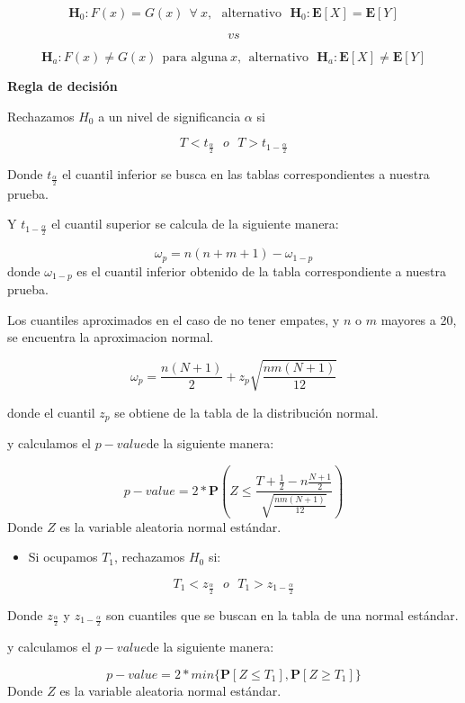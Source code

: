 \documentclass[
  a4paper,
  oneside,
  openany]{book}
\providecommand{\tightlist}{%
  \setlength{\itemsep}{0pt}\setlength{\parskip}{0pt}}
\begin{document}
\[\textbf{H}_0: F(x) = G(x) \ \  \forall\ x, \ \ \  \mbox{alternativo} \ \ \  \textbf{H}_0:\mathbf{E}[X] = \mathbf{E}[Y]\]

\[vs\]

\[\textbf{H}_a: F(x) \neq G(x) \ \ \mbox{para alguna} \ x,  \ \ \mbox{alternativo} \ \ \  \textbf{H}_a:
\mathbf{E}[X] \neq \mathbf{E}[Y]\]

\textbf{Regla de decisión}

Rechazamos \(H_0\) a un nivel de significancia \(\alpha\) si

\[T < t_{\frac{\alpha}{2}} \ \ \   o \ \ \ T > t_{1-\frac{\alpha}{2}}\]

Donde \(t_\frac{\alpha}{2}\) el cuantil inferior se busca en las tablas correspondientes a nuestra prueba.

Y \(t_{1-\frac{\alpha}{2}}\) el cuantil superior se calcula de la siguiente manera:

\[\omega_p= n(n+m+1)-\omega_{1-p}\]
donde \(\omega_{1-p}\) es el cuantil inferior obtenido de la tabla correspondiente a nuestra prueba.

Los cuantiles aproximados en el caso de no tener empates, y \(n\) o \(m\) mayores a 20, se encuentra la aproximacion normal.

\[\omega_p= \frac{n(N+1)}{2} + z_p\sqrt{\frac{n m(N+1)}{12}}\]

donde el cuantil \(z_p\) se obtiene de la tabla de la distribución normal.

y calculamos el \(p-value\)de la siguiente manera:

\[p-value = 2*\mathbf{P}\left(Z\leq\frac{T+\frac{1}{2}-n\frac{N+1}{2}}{\sqrt{\frac{nm(N+1)}{12}}}\right)\]
Donde \(Z\) es la variable aleatoria normal estándar.

\begin{itemize}
\tightlist
\item
  Si ocupamos \(T_{1}\), rechazamos \(H_0\) si:
\end{itemize}

\[T_{1} < z_{\frac{\alpha}{2}} \ \ \  o \ \ \  T_{1} > z_{1-\frac{\alpha}{2}}\]

Donde \(z_\frac{\alpha}{2}\) y \(z_{1-\frac{\alpha}{2}}\) son cuantiles que se buscan en la tabla de una normal estándar.

y calculamos el \(p-value\)de la siguiente manera:

\[p-value=2*min\{\mathbf{P}[Z\leq T_{1}],\mathbf{P}[Z\geq T_{1}]\}\]
Donde \(Z\) es la variable aleatoria normal estándar.
\end{document}
